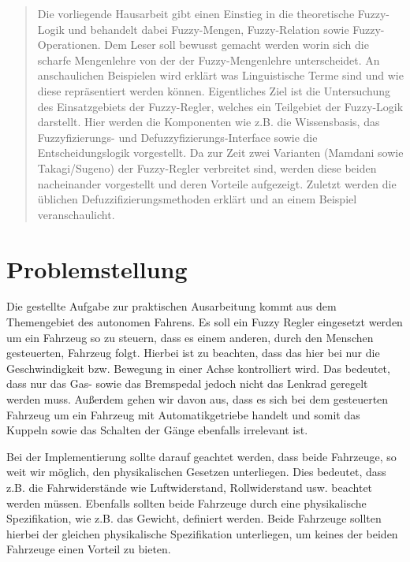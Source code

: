 \documentclass[12pt,a4paper,bibliography=totocnumbered,listof=totocnumbered, abstracton]{scrartcl}
\theoremstyle{Umgebung}
\begin{document}
\begin{abstract} 
	Die vorliegende Hausarbeit gibt einen Einstieg in die theoretische Fuzzy-Logik und behandelt dabei Fuzzy-Mengen, Fuzzy-Relation sowie Fuzzy-Operationen. Dem Leser soll bewusst gemacht werden worin sich die scharfe Mengenlehre von der der Fuzzy-Mengenlehre unterscheidet. An anschaulichen Beispielen wird erklärt was Linguistische Terme sind und wie diese repräsentiert werden können. Eigentliches Ziel ist die Untersuchung des Einsatzgebiets der Fuzzy-Regler, welches ein Teilgebiet der Fuzzy-Logik darstellt. Hier werden die Komponenten wie z.B. die Wissensbasis, das Fuzzyfizierungs- und Defuzzyfizierungs-Interface sowie die Entscheidungslogik vorgestellt. Da zur Zeit zwei Varianten (Mamdani sowie Takagi/Sugeno)  der Fuzzy-Regler verbreitet sind, werden diese beiden nacheinander vorgestellt und deren Vorteile aufgezeigt. Zuletzt werden die üblichen Defuzzifizierungsmethoden erklärt und an einem Beispiel veranschaulicht.
\end{abstract} 
\newpage

\section{Problemstellung}

Die gestellte Aufgabe zur praktischen Ausarbeitung kommt aus dem Themengebiet des autonomen Fahrens. Es soll ein Fuzzy Regler eingesetzt werden um ein Fahrzeug so zu steuern, dass es einem anderen, durch den Menschen gesteuerten, Fahrzeug folgt.  Hierbei ist zu beachten, dass das hier bei nur die Geschwindigkeit bzw. Bewegung in einer Achse kontrolliert wird. Das bedeutet, dass nur das Gas- sowie das Bremspedal jedoch nicht das Lenkrad geregelt werden muss. Außerdem gehen wir davon aus, dass es sich bei dem gesteuerten Fahrzeug um ein Fahrzeug mit Automatikgetriebe handelt und somit das Kuppeln sowie das Schalten der Gänge ebenfalls irrelevant ist. 

Bei der Implementierung sollte darauf geachtet werden, dass beide Fahrzeuge, so weit wir möglich, den physikalischen Gesetzen unterliegen. Dies bedeutet, dass z.B. die Fahrwiderstände wie Luftwiderstand, Rollwiderstand usw. beachtet werden müssen. Ebenfalls sollten beide Fahrzeuge durch eine physikalische Spezifikation, wie z.B. das Gewicht, definiert werden. Beide Fahrzeuge sollten hierbei der gleichen physikalische Spezifikation unterliegen, um keines der beiden Fahrzeuge einen Vorteil zu bieten.
\end{document}
